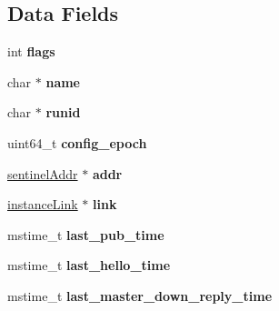 \subsection*{Data Fields}
\begin{DoxyCompactItemize}
\item 
\mbox{\label{structsentinelRedisInstance_a85b24b9515829ed4737511a0212ba62d}} 
int {\bfseries flags}
\item 
\mbox{\label{structsentinelRedisInstance_aa5d731b9b7d57ac98e7f9ac7a2dddb11}} 
char $\ast$ {\bfseries name}
\item 
\mbox{\label{structsentinelRedisInstance_a643a3a4f32d2ce393bbb1aea9456e7c0}} 
char $\ast$ {\bfseries runid}
\item 
\mbox{\label{structsentinelRedisInstance_a9f518c6053d3ea4480058ea3dc8f7a3d}} 
uint64\+\_\+t {\bfseries config\+\_\+epoch}
\item 
\mbox{\label{structsentinelRedisInstance_a92f4002afcb4ebd41a10260cfb596b53}} 
\hyperlink{structsentinelAddr}{sentinel\+Addr} $\ast$ {\bfseries addr}
\item 
\mbox{\label{structsentinelRedisInstance_ab3353445f22502b9cd61f2e8d2685a8b}} 
\hyperlink{structinstanceLink}{instance\+Link} $\ast$ {\bfseries link}
\item 
\mbox{\label{structsentinelRedisInstance_a7cb4beb806889669d2d124c8379bec7d}} 
mstime\+\_\+t {\bfseries last\+\_\+pub\+\_\+time}
\item 
\mbox{\label{structsentinelRedisInstance_ab7654dbdf71e228762a8636b3eec817f}} 
mstime\+\_\+t {\bfseries last\+\_\+hello\+\_\+time}
\item 
\mbox{\label{structsentinelRedisInstance_ad8c2a9b8b502bb7e1785491f287417bd}} 
mstime\+\_\+t {\bfseries last\+\_\+master\+\_\+down\+\_\+reply\+\_\+time}
\item 
\mbox{\label{structsentinelRedisInstance_a81c3ce3efbd8306b14b3e208ca004138}} 

\end{DoxyCompactItemize}
